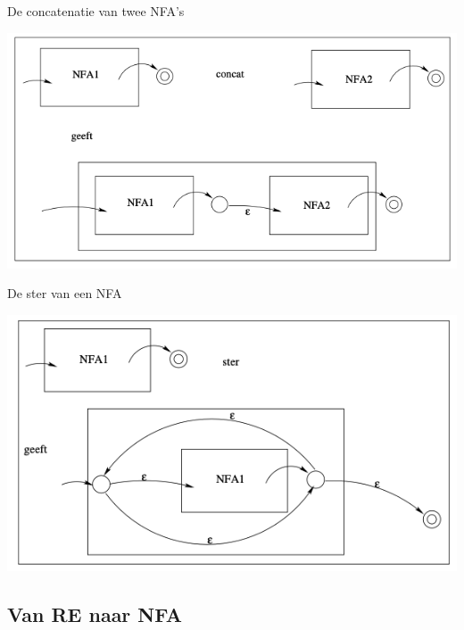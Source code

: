 \newpage

\begin{pro}{De concatenatie van twee NFA's}
    \begin{center}
        \includegraphics[scale = 0.35]{Images/ConcatNFA}
    \end{center}
\end{pro}

\begin{pro}{De ster van een NFA}
    \begin{center}
        \includegraphics[scale = 0.4]{Images/SterNFA}
    \end{center}
\end{pro}

\subsection{Van RE naar NFA}

\vspace{0.5cm}

